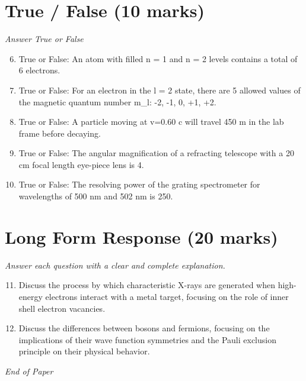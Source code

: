 \documentclass[12pt]{article}
\begin{document}
\section*{True / False (10 marks)}
\textit{Answer True or False}
\begin{enumerate}[label=\arabic*.]
\setcounter{enumi}{5}
\item True or False: An atom with filled n = 1 and n = 2 levels contains a total of 6 electrons.
\item True or False: For an electron in the l = 2 state, there are 5 allowed values of the magnetic quantum number m\_l: -2, -1, 0, +1, +2.
\item True or False: A particle moving at v=0.60 c will travel 450 m in the lab frame before decaying.
\item True or False: The angular magnification of a refracting telescope with a 20 cm focal length eye-piece lens is 4.
\item True or False: The resolving power of the grating spectrometer for wavelengths of 500 nm and 502 nm is 250.
\end{enumerate}

\section*{Long Form Response (20 marks)}
\textit{Answer each question with a clear and complete explanation.}
\begin{enumerate}[label=\arabic*.]
\setcounter{enumi}{10}
\item Discuss the process by which characteristic X-rays are generated when high-energy electrons interact with a metal target, focusing on the role of inner shell electron vacancies.
\item Discuss the differences between bosons and fermions, focusing on the implications of their wave function symmetries and the Pauli exclusion principle on their physical behavior.
\end{enumerate}

\vfill
\noindent\textit{End of Paper}
\end{document}
